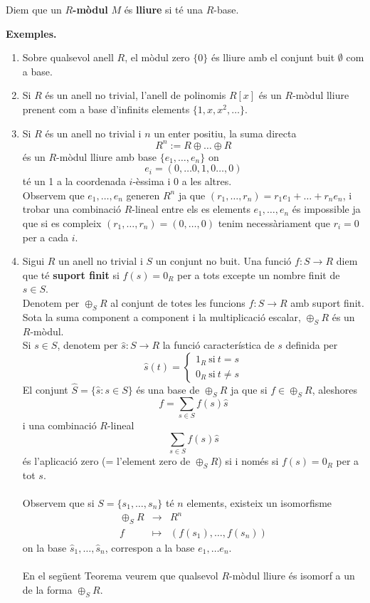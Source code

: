 \begin{definition}
Diem que un \textbf{$R$-mòdul} $M$ és \textbf{lliure} si té una $R$-base.
\end{definition}

\textbf{Exemples.}\begin{enumerate}[(1)]
\item Sobre qualsevol anell $R$, el mòdul zero $\{0\}$ és lliure amb el conjunt buit $\emptyset$ com a base.
\item Si $R$ és un anell no trivial, l'anell de polinomis $R[x]$ és un $R$-mòdul lliure prenent com a base d'infinits elements $\{1,x,x^2,\dots \}$.
\item Si $R$ és un anell no trivial i $n$ un enter positiu, la suma directa 
$$
R^n:=R\oplus \dots \oplus R
$$
és un $R$-mòdul lliure amb base $\{e_1, \dots , e_n\}$ on 
$$
e_i=(0,\dots 0,1,0\dots , 0)
$$
té un 1 a la coordenada $i$-èssima i $0$ a les altres. 
\\
Observem que $e_1,\dots,e_n$ generen $R^n$ ja que $(r_1,\dots, r_n)=r_1e_1+\dots+r_ne_n$, i trobar una combinació $R$-lineal entre els es elements $e_1,\dots ,e_n$ és impossible ja que si es compleix $(r_1,\dots,r_n)=(0,\dots,0)$ tenim necessàriament que $r_i=0$ per a cada $i$.
\item Sigui $R$ un anell no trivial i $S$ un conjunt no buit. Una funció $f:S\rightarrow R$ diem que té \textbf{suport finit} si $f(s)=0_R$ per a tots excepte un nombre finit de $s\in S$. \\ Denotem per  $\oplus_SR$ al conjunt de totes les funcions $f:S\rightarrow R$ amb suport finit. Sota la suma component a component i la multiplicació escalar, $\oplus_SR$ és un $R$-mòdul. \\ Si $s\in S$, denotem per $\hat{s}:S\rightarrow R$ la funció característica de $s$ definida per 
$$
\hat{s}(t)=\begin{cases}
1_R \ \text{si} \ t=s \\
0_R \ \text{si} \ t\neq s
\end{cases}
$$
El conjunt $\hat{S}=\{ \hat{s} : s\in S \}$ és una base de $\oplus_SR$ ja que si $f\in \oplus_SR$, aleshores 
$$
f=\sum_{s\in S}f(s)\hat{s}
$$
i una combinació $R$-lineal 
$$
\sum_{s\in S}f(s)\hat{s}
$$
és l'aplicació zero (= l'element zero de $\oplus_SR$) si i només si $f(s)=0_R$ per a tot $s$. \\
\\
Observem que si $S=\{ s_1,\dots , s_n\}$ té $n$ elements, existeix un isomorfisme
\begin{eqnarray*}
\oplus_SR &\rightarrow  &R^n \\
f&\mapsto &(f(s_1),\dots,f(s_n))
\end{eqnarray*}
on la base $\hat{s}_1,\dots,\hat{s}_n$, correspon a la base $e_1,\dots e_n$. \\\\
En el següent Teorema veurem que qualsevol $R$-mòdul lliure és isomorf a un de la forma $\oplus_SR$.
\end{enumerate}


